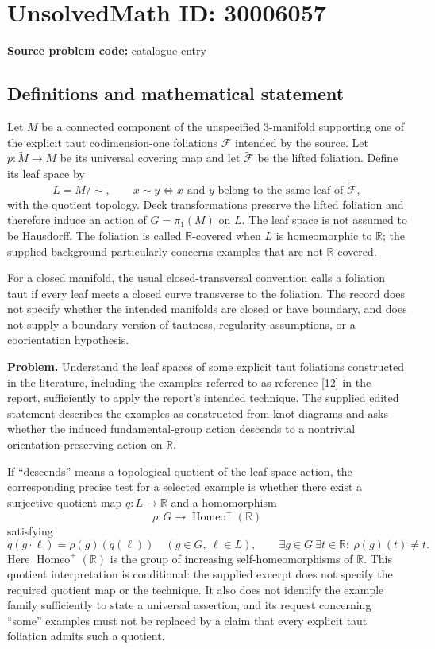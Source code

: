 \documentclass[11pt]{article}
\begin{document}
\section*{UnsolvedMath ID: 30006057}
\textbf{Source problem code:} catalogue entry
\subsection{Definitions and mathematical statement}
Let \(M\) be a connected component of the unspecified \(3\)-manifold supporting one of the explicit taut codimension-one foliations \(\mathcal F\) intended by the source. Let \(p:\widetilde M\to M\) be its universal covering map and let \(\widetilde{\mathcal F}\) be the lifted foliation. Define its leaf space by
\[
L=\widetilde M/\!\sim,\qquad x\sim y\iff x\text{ and }y\text{ belong to the same leaf of }\widetilde{\mathcal F},
\]
with the quotient topology. Deck transformations preserve the lifted foliation and therefore induce an action of \(G=\pi_1(M)\) on \(L\). The leaf space is not assumed to be Hausdorff. The foliation is called \(\mathbb R\)-covered when \(L\) is homeomorphic to \(\mathbb R\); the supplied background particularly concerns examples that are not \(\mathbb R\)-covered.

For a closed manifold, the usual closed-transversal convention calls a foliation taut if every leaf meets a closed curve transverse to the foliation. The record does not specify whether the intended manifolds are closed or have boundary, and does not supply a boundary version of tautness, regularity assumptions, or a coorientation hypothesis.

\textbf{Problem.} Understand the leaf spaces of some explicit taut foliations constructed in the literature, including the examples referred to as reference [12] in the report, sufficiently to apply the report's intended technique. The supplied edited statement describes the examples as constructed from knot diagrams and asks whether the induced fundamental-group action descends to a nontrivial orientation-preserving action on \(\mathbb R\).

If ``descends'' means a topological quotient of the leaf-space action, the corresponding precise test for a selected example is whether there exist a surjective quotient map \(q:L\to\mathbb R\) and a homomorphism
\[
\rho:G\longrightarrow\operatorname{Homeo}^{+}(\mathbb R)
\]
satisfying
\[
q(g\cdot\ell)=\rho(g)(q(\ell))\quad(g\in G,\ \ell\in L),
\qquad
\exists g\in G\ \exists t\in\mathbb R:\ \rho(g)(t)\ne t.
\]
Here \(\operatorname{Homeo}^{+}(\mathbb R)\) is the group of increasing self-homeomorphisms of \(\mathbb R\). This quotient interpretation is conditional: the supplied excerpt does not specify the required quotient map or the technique. It also does not identify the example family sufficiently to state a universal assertion, and its request concerning ``some'' examples must not be replaced by a claim that every explicit taut foliation admits such a quotient.
\end{document}
